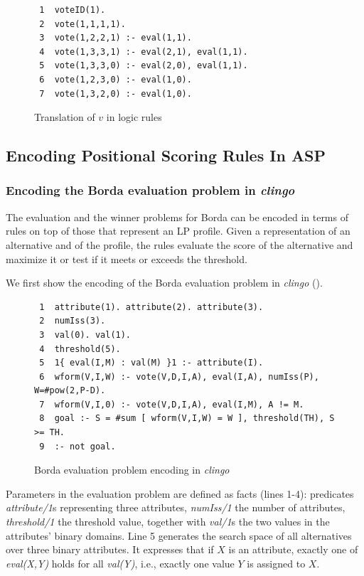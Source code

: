 \begin{figure}[H]
   \small
	\begin{framed}
		\begin{verbatim}
 1  voteID(1).
 2  vote(1,1,1,1).
 3  vote(1,2,2,1) :- eval(1,1).
 4  vote(1,3,3,1) :- eval(2,1), eval(1,1).
 5  vote(1,3,3,0) :- eval(2,0), eval(1,1).
 6  vote(1,2,3,0) :- eval(1,0).
 7  vote(1,3,2,0) :- eval(1,0).
		\end{verbatim}
	\end{framed}
	\caption{Translation of $v$ in logic rules}
  \label{fig:LPTreeASP}
\end{figure}
  


\subsection{Encoding Positional Scoring Rules In ASP}

\subsubsection{Encoding the Borda evaluation problem in \emph{clingo}}

The evaluation and the winner problems for Borda can 
be encoded in terms of rules on top of those that represent an LP profile.
Given a representation of an alternative and of the profile, the rules
evaluate the score of the alternative and maximize it or test if 
it meets or exceeds the threshold. 

We first show the encoding of the Borda evaluation problem in \emph{clingo}
().
\begin{figure}[ht]
  \centering
	\begin{framed}
	\small
		\begin{verbatim}
 1  attribute(1). attribute(2). attribute(3).
 2  numIss(3).
 3  val(0). val(1).
 4  threshold(5).
 5  1{ eval(I,M) : val(M) }1 :- attribute(I).
 6  wform(V,I,W) :- vote(V,D,I,A), eval(I,A), numIss(P), W=#pow(2,P-D).
 7  wform(V,I,0) :- vote(V,D,I,A), eval(I,M), A != M.
 8  goal :- S = #sum [ wform(V,I,W) = W ], threshold(TH), S >= TH.
 9  :- not goal.
		\end{verbatim}
	\end{framed}
	\caption{Borda evaluation problem encoding in \emph{clingo}}
	\label{fig:clingo:bordaEval}
\end{figure}
Parameters in the evaluation problem are defined as facts (lines 1-4):
predicates \textit{attribute/1}s representing three attributes, 
\textit{numIss/1} the number of attributes, \textit{threshold/1} the threshold value, 
together with \textit{val/1}s the two values in the attributes' binary domains.
Line 5 generates the search space of all alternatives over three
binary attributes.
It expresses that if $X$ is an attribute, exactly one of 
\textit{eval(X,Y)} holds for all \textit{val(Y)},
i.e., exactly one value $Y$ is assigned to $X$.


